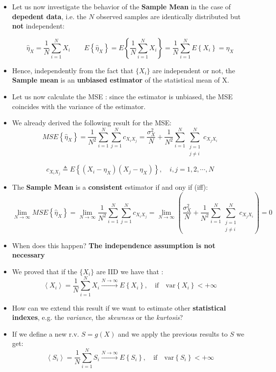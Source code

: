 \begin{itemize}
\item Let us now investigate the behavior of the \textbf{Sample Mean} in the case of \textbf{depedent data}, i.e. the \(N\) observed samples are identically distributed but \textbf{not} independent:

\[
\hat{\eta}_X = \frac{1}{N} \sum_{i=1}^N X_i \qquad
E\left\{\hat{\eta}_X\right\} =
E\left\{\frac{1}{N} \sum_{i=1}^N X_i\right\} =
\frac{1}{N} \sum_{i=1}^N E\left\{X_i\right\} =
\eta_X
\]
\item Hence, independently from the fact that \(\{X_i\}\) are independent or not, the \textbf{Sample mean} is an \textbf{unbiased estimator} of the statistical mean of X.

\item Let us now calculate the MSE : since the estimator is unbiased, the MSE coincides with the variance of the estimator.

\item We already derived the following result for the MSE:
\[
MSE\left\{ \hat{\eta}_X \right\}
= \frac{1}{N^2} \sum_{i=1}^{N} \sum_{j=1}^{N} c_{X_i X_j}
= \frac{\sigma_X^2}{N}
+ \frac{1}{N^2} \sum_{i=1}^{N} \sum_{\substack{j=1 \\ j \neq i}}^{N} c_{X_j X_i}
\]

\[
c_{X_i X_j} \triangleq E\left\{ (X_i - \eta_X)(X_j - \eta_X) \right\},\quad i, j = 1,2, \cdots, N
\]
\item The \textbf{Sample Mean} is a \textbf{consistent} estimator if and ony if (iff):
\[
\lim_{N \to \infty} MSE\left\{\hat{\eta}_X\right\}
= \lim_{N \to \infty} \frac{1}{N^2} \sum_{i=1}^{N} \sum_{j=1}^{N} c_{X_i X_j}
= \lim_{N \to \infty} \left( \frac{\sigma_X^2}{N}
+ \frac{1}{N^2} \sum_{i=1}^{N} \sum_{\substack{j=1 \\ j \neq i}}^{N} c_{X_j X_i} \right)
= 0
\]
\item When does this happen? \textbf{The independence assumption is not necessary}

\item We proved that if the \(\{X_i\}\) are IID we have that :
\[
\left\langle X_i \right\rangle = \frac{1}{N} \sum_{i=1}^N X_i \xrightarrow{N \to \infty} E\left\{ X_i \right\}, \quad \text{if} \quad \mathrm{var}\left\{X_i\right\} < +\infty
\]
\item How can we extend this result if we want to estimate other \textbf{statistical indexes}, e.g. the \textit{variance}, the \textit{skewness} or the \textit{kurtosis}?
\item If we define a new r.v. \(S=g(X)\) and we apply the previous results to \(S\) we get:
\[
\left\langle S_i \right\rangle = \frac{1}{N} \sum_{i=1}^N S_i \xrightarrow{N \to \infty} E\left\{ S_i \right\}, \quad \text{if} \quad \mathrm{var}\left\{ S_i \right\} < +\infty
\]


\end{itemize}
